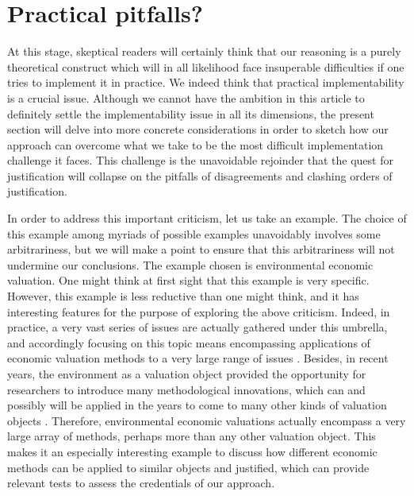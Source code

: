 \documentclass[preprint, french, english, 11pt, authoryear]{elsarticle}%
\begin{document}
\section{Practical pitfalls?}
At this stage, skeptical readers will certainly think that our reasoning is a purely theoretical construct which will in all likelihood face insuperable difficulties if one tries to implement it in practice. We indeed think that practical implementability is a crucial issue. Although we cannot have the ambition in this article to definitely settle the implementability issue in all its dimensions, the present section will delve into more concrete considerations in order to sketch how our approach can overcome what we take to be the most difficult implementation challenge it faces. This challenge is the unavoidable rejoinder that the quest for justification will collapse on the pitfalls of disagreements and clashing orders of justification.

In order to address this important criticism, let us take an example. The choice of this example among myriads of possible examples unavoidably involves some arbitrariness, but we will make a point to ensure that this arbitrariness will not undermine our conclusions. The example chosen is environmental economic valuation. One might think at first sight that this example is very specific. However, this example is less reductive than one might think, and it has interesting features for the purpose of exploring the above criticism. Indeed, in practice, a very vast series of issues are actually gathered under this umbrella, and accordingly focusing on this topic means encompassing applications of economic valuation methods to a very large range of issues \citep{kontoleon_biodiversity_2007}. Besides, in recent years, the environment as a valuation object provided the opportunity for researchers to introduce many methodological innovations, which can and possibly will be applied in the years to come to many other kinds of valuation objects \citep{bartkowski_economic_2017}. Therefore, environmental economic valuations actually encompass a very large array of methods, perhaps more than any other valuation object. This makes it an especially interesting example to discuss how different economic methods can be applied to similar objects and justified, which can provide relevant tests to assess the credentials of our approach.
\end{document}
